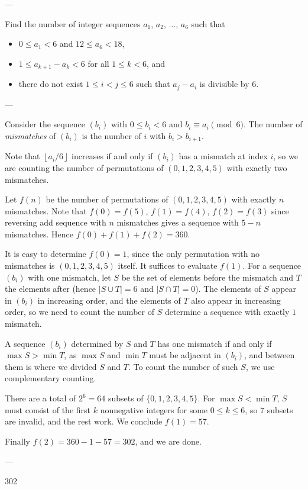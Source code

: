 
---

Find the number of integer sequences $a_1$, $a_2$, $\ldots$, $a_6$ such that
\begin{itemize}
    \item $0\le a_1<6$ and $12\le a_6<18$,
    \item $1\le a_{k+1}-a_k<6$ for all $1\le k<6$, and
    \item there do not exist $1\le i<j\le6$ such that $a_j-a_i$ is divisible by $6$.
\end{itemize} 

--- 

Consider the sequence $(b_i)$ with $0\le b_i<6$ and $b_i\equiv a_i\pmod6$. The number of \emph{mismatches} of $(b_i)$ is the number of $i$ with $b_i>b_{i+1}$.

Note that $\left\lfloor a_i/6\right\rfloor$ increases if and only if $(b_i)$ has a mismatch at index $i$, so we are counting the number of permutations of $(0,1,2,3,4,5)$ with exactly two mismatches.

Let $f(n)$ be the number of permutations of $(0,1,2,3,4,5)$ with exactly $n$ mismatches. Note that $f(0)=f(5)$, $f(1)=f(4)$, $f(2)=f(3)$ since reversing add sequence with $n$ mismatches gives a sequence with $5-n$ mismatches. Hence $f(0)+f(1)+f(2)=360$.

It is easy to determine $f(0)=1$, since the only permutation with no mismatches is $(0,1,2,3,4,5)$ itself. It suffices to evaluate $f(1)$. For a sequence $(b_i)$ with one mismatch, let $S$ be the set of elements before the mismatch and $T$ the elements after (hence $|S\cup T|=6$ and $|S\cap T|=0$). The elements of $S$ appear in $(b_i)$ in increasing order, and the elements of $T$ also appear in increasing order, so we need to count the number of $S$ determine a sequence with exactly $1$ mismatch.

A sequence $(b_i)$ determined by $S$ and $T$ has one mismatch if and only if $\max S>\min T$, as $\max S$ and $\min T$ must be adjacent in $(b_i)$, and between them is where we divided $S$ and $T$. To count the number of such $S$, we use complementary counting.

There are a total of $2^6=64$ subsets of $\{0,1,2,3,4,5\}$. For $\max S<\min T$, $S$ must consist of the first $k$ nonnegative integers for some $0\le k\le6$, so $7$ subsets are invalid, and the rest work. We conclude $f(1)=57$.

Finally $f(2)=360-1-57=302$, and we are done.

---

302
